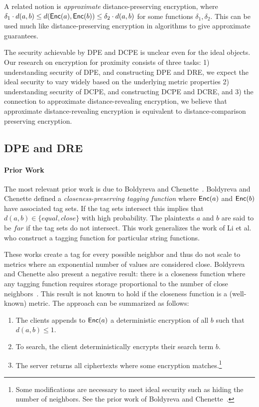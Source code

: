 A related notion is \emph{approximate} distance-preserving encryption, where  $\delta_1 \cdot d(a,b) \leq d(\mathsf{Enc}(a), \mathsf{Enc}(b)) \leq \delta_2  \cdot d(a,b)$ for some functions $\delta_1, \delta_2$.  This can be used much like distance-preserving encryption in algorithms to give approximate guarantees.

The security achievable by DPE and DCPE is unclear even for the ideal objects.
Our research on encryption for proximity  consists of three tasks: 1) understanding security of DPE, and constructing DPE and DRE, we expect the ideal security to vary widely based on the underlying metric properties 2) understanding security of DCPE, and constructing DCPE and DCRE,  and 3) the connection to approximate distance-revealing encryption, we believe that approximate distance-revealing encryption is equivalent to distance-comparison preserving encryption.

\subsection{DPE and DRE}

\paragraph{Prior Work}
The most relevant prior work is due to Boldyreva and Chenette~\cite{boldyreva2014efficient}.  Boldyreva and Chenette defined a \emph{closeness-preserving tagging function} where $\mathsf{Enc}(a)$ and $\mathsf{Enc}(b)$ have associated tag sets.  If the tag sets intersect this implies that $d(a,b) \in\{equal, close\}$ with high probability.  The plaintexts $a$ and $b$ are said to be $far$ if the tag sets do not intersect.  This work generalizes the work of Li et al.~\cite{li2010fuzzy,wang2013efficient} who construct a tagging function for particular string functions.  

These works create a tag for every possible neighbor and thus do not scale to metrics where an exponential number of values are considered close. Boldyreva and Chenette also present a negative result: there is a closeness function where any tagging function requires storage proportional to the number of close neighbors~\cite[Theorem 5.2]{boldyreva2014efficient}.  This result is not known to hold if the closeness function is a (well-known) metric.  
The approach can be summarized as follows:
\begin{enumerate}\setlength\itemsep{0em}
\item The clients appends to $\mathsf{Enc}(a)$ a deterministic encryption of all $b$ such that $d(a,b) \le 1$.
\item To search, the client deterministically encrypts their search term $b$.
\item The server returns all ciphertexts where some encryption matches.\footnote{Some  modifications are necessary to meet ideal security such as hiding the number of neighbors.  See the prior work of Boldyreva and Chenette~\cite{boldyreva2014efficient}.}  
\end{enumerate}

